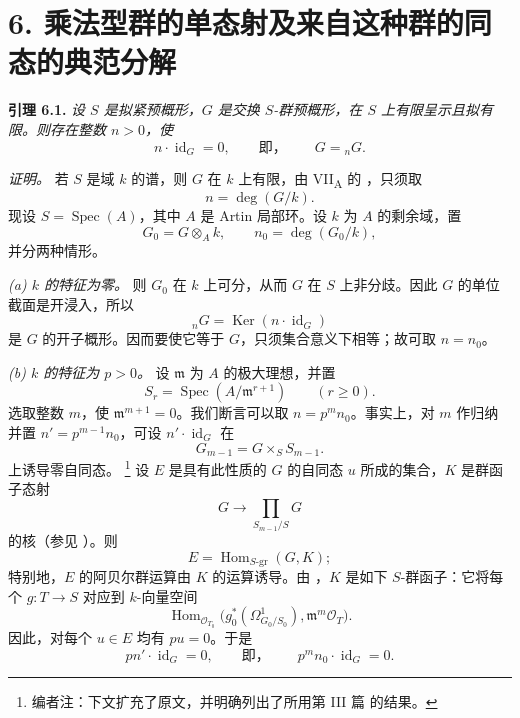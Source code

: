 
\setcounter{footnote}{38}

\section*{6. 乘法型群的单态射及来自这种群的同态的典范分解}

\medskip
\noindent{}\textbf{引理 6.1.}
\textit{设 \(S\) 是拟紧预概形，\(G\) 是交换 \(S\)-群预概形，在 \(S\) 上有限呈示且拟有限。则存在整数 \(n>0\)，使
\[
  n\cdot\operatorname{id}_G=0,
  \qquad\text{即，}\qquad
  G={}_nG.
\]}

\emph{证明。}
若 \(S\) 是域 \(k\) 的谱，则 \(G\) 在 \(k\) 上有限，由 VII\textsubscript{A} 的 ，只须取
\[
  n=\deg(G/k).
\]
现设 \(S=\operatorname{Spec}(A)\)，其中 \(A\) 是 Artin 局部环。设 \(k\) 为 \(A\) 的剩余域，置
\[
  G_0=G\otimes_A k,
  \qquad
  n_0=\deg(G_0/k),
\]
并分两种情形。

\smallskip
{}\noindent\textit{(a) \(k\) 的特征为零。}
则 \(G_0\) 在 \(k\) 上可分，从而 \(G\) 在 \(S\) 上非分歧。因此 \(G\) 的单位截面是开浸入，所以
\[
  {}_nG=\operatorname{Ker}(n\cdot\operatorname{id}_G)
\]
是 \(G\) 的开子概形。因而要使它等于 \(G\)，只须集合意义下相等；故可取 \(n=n_0\)。

\smallskip
{}\noindent\textit{(b) \(k\) 的特征为 \(p>0\)。}
设 \(\mathfrak m\) 为 \(A\) 的极大理想，并置
\[
  S_r=\operatorname{Spec}(A/\mathfrak m^{r+1})
  \qquad (r\geq0).
\]
选取整数 \(m\)，使 \(\mathfrak m^{m+1}=0\)。我们断言可以取 \(n=p^mn_0\)。事实上，对 \(m\) 作归纳并置 \(n'=p^{m-1}n_0\)，可设 \(n'\cdot\operatorname{id}_G\) 在
\[
  G_{m-1}=G\times_S S_{m-1}.
\]
上诱导零自同态。
\footnote{编者注：下文扩充了原文，并明确列出了所用第 III 篇 的结果。}
设 \(E\) 是具有此性质的 \(G\) 的自同态 \(u\) 所成的集合，\(K\) 是群函子态射
\[
  G\longrightarrow \prod_{S_{m-1}/S}G
\]
的核（参见 ）。则
\[
  E=\operatorname{Hom}_{S\text{-}\mathrm{gr}}(G,K);
\]
特别地，\(E\) 的阿贝尔群运算由 \(K\) 的运算诱导。由 ，\(K\) 是如下 \(S\)-群函子：它将每个 \(g:T\to S\) 对应到 \(k\)-向量空间
\[
  \operatorname{Hom}_{\mathscr O_{T_0}}
  \bigl(
    g_0^*(\Omega^1_{G_0/S_0}),
    \mathfrak m^m\mathscr O_T
  \bigr).
\]
因此，对每个 \(u\in E\) 均有 \(pu=0\)。于是
\[
  pn'\cdot\operatorname{id}_G=0,
  \qquad\text{即，}\qquad
  p^mn_0\cdot\operatorname{id}_G=0.
\]

